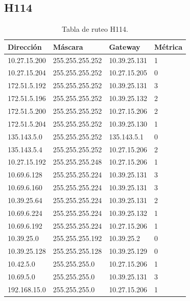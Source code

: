 \documentclass[12pt,titlepage]{article}
\begin{document}
\subsection{H114}
\begin{table}
  \begin{center}
    \begin{tabular}{|l|l|l|l|}
      \hline
        \bf{Direcci\'on} & \bf{M\'ascara} & \bf{Gateway} & \bf{M\'etrica} \\
      \hline 
	10.27.15.200  & 255.255.255.252 & 10.39.25.131 & 1 \\
        10.27.15.204  & 255.255.255.252 & 10.27.15.205 & 0 \\
        172.51.5.192  & 255.255.255.252 & 10.39.25.131 & 3 \\
        172.51.5.196  & 255.255.255.252 & 10.39.25.132 & 2 \\
        172.51.5.200  & 255.255.255.252 & 10.27.15.206 & 2 \\
        172.51.5.204  & 255.255.255.252 & 10.39.25.130 & 1 \\
        135.143.5.0   & 255.255.255.252 & 135.143.5.1 & 0 \\
        135.143.5.4   & 255.255.255.252 & 10.27.15.206 & 2 \\ 	
	10.27.15.192  & 255.255.255.248 & 10.27.15.206 & 1 \\
	10.69.6.128   & 255.255.255.224 & 10.39.25.131 & 3 \\
        10.69.6.160   & 255.255.255.224 & 10.39.25.131 & 3 \\
	10.39.25.64   & 255.255.255.224 & 10.39.25.131 & 2 \\       
	10.69.6.224   & 255.255.255.224 & 10.39.25.132 & 1 \\
	10.69.6.192   & 255.255.255.224 & 10.27.15.206 & 1 \\	
	10.39.25.0    & 255.255.255.192 & 10.39.25.2 & 0 \\
	10.39.25.128  & 255.255.255.128 & 10.39.25.129 & 0 \\
	10.42.5.0     & 255.255.255.0 & 10.27.15.206 & 1 \\
        10.69.5.0     & 255.255.255.0 & 10.39.25.131 & 3 \\
        192.168.15.0  & 255.255.255.0 & 10.27.15.206 & 1 \\  
    \hline
    \end{tabular} \\
  \end{center}
  \caption{Tabla de ruteo H114.}
\end{table}
\newpage
\end{document}
